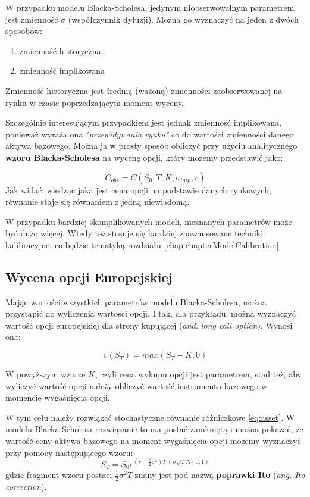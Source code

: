 \documentclass{pracamgr}
\begin{document}
W przypadku modelu Blacka-Scholesa, jedynym niobserwowalnym parametrem jest zmienność $\sigma$ (współczynnik dyfuzji).
Można go wyznaczyć na jeden z dwóch sposobów:
\begin{enumerate}
  \item zmienność historyczna
  \item zmienność implikowana
\end{enumerate}

Zmienność historyczna jest średnią (ważoną) zmienności zaobserwowanej na rynku w czasie poprzedzającym moment wyceny.

Szczególnie interesującym przypadkiem jest jednak zmienność implikowana, ponieważ wyraża ona \textit{"przewidywania rynku"} co do wartości zmienności danego aktywa bazowego. 
Można ja w prosty sposób obliczyć przy użyciu analitycznego \textbf{wzoru Blacka-Scholesa} na wycenę opcji, który 
możemy przedstawić jako:

\begin{equation}
  C_{obs} = C(S_0, T, K, \sigma_{imp}, r)
\end{equation}
Jak widać, wiedząc jaka jest cena opcji na podstawie danych rynkowych, równanie staje się równaniem z jedną niewiadomą. 

W przypadku bardziej skomplikowanych modeli, nieznanych parametrów może być dużo więcej. Wtedy też 
stosuje się bardziej zaawansowane techniki kalibracyjne, co będzie tematyką rozdziału \ref{chap:chapterModelCalibration}.


\subsection{Wycena opcji Europejskiej} %
\label{sub:subsection_name}
 
Mając wartości wszystkich parametrów modelu Blacka-Scholesa, można przystąpić
do wyliczenia wartości opcji. I tak, dla przykładu, można wyznaczyć wartość opcji europejskiej dla strony kupującej 
(\textit{and. long call option}). Wynosi ona:

\begin{equation}
  v(S_T) = max(S_T-K, 0)
\end{equation}

W powyższym wzorze $K$, czyli cena wykupu opcji jest parametrem, stąd też, aby wyliczyć wartość opcji należy obliczyć wartość instrumentu bazowego w momencie wygaśnięcia opcji.

W tym celu należy rozwiązać stochastyczne równanie różniczkowe \ref{eq:asset}. W modelu Blacka-Scholesa rozwiązanie to ma
postać zamkniętą i można pokazać, że wartość ceny aktywa bazowego na moment wygaśnięcia opcji możemy wyznaczyć przy 
pomocy następującego wzoru:
\begin{equation}
\label{eq:closedFormBlack} 
  S_T = S_0 e^{(r - \frac{1}{2} \sigma^2)T+\sigma \sqrt{T} N(0,1)}
\end{equation}
gdzie fragment wzoru postaci $\frac{1}{2} \sigma^2 T$ znany jest pod nazwą \textbf{poprawki Ito} (\textit{ang. Ito correction}).
\end{document}
